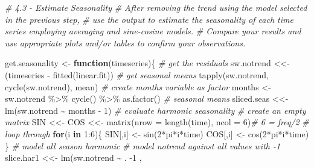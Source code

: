 \documentclass[
]{article}
\newenvironment{Shaded}{\begin{snugshade}}{\end{snugshade}}
\newcommand{\AttributeTok}[1]{\textcolor[rgb]{0.77,0.63,0.00}{#1}}
\newcommand{\CommentTok}[1]{\textcolor[rgb]{0.56,0.35,0.01}{\textit{#1}}}
\newcommand{\ControlFlowTok}[1]{\textcolor[rgb]{0.13,0.29,0.53}{\textbf{#1}}}
\newcommand{\DecValTok}[1]{\textcolor[rgb]{0.00,0.00,0.81}{#1}}
\newcommand{\FunctionTok}[1]{\textcolor[rgb]{0.00,0.00,0.00}{#1}}
\newcommand{\NormalTok}[1]{#1}
\newcommand{\OtherTok}[1]{\textcolor[rgb]{0.56,0.35,0.01}{#1}}
\newcommand{\SpecialCharTok}[1]{\textcolor[rgb]{0.00,0.00,0.00}{#1}}
\begin{document}
\begin{Shaded}
\begin{Highlighting}[]
\CommentTok{\# 4.3 {-} Estimate Seasonality}
\CommentTok{\# After removing the trend using the model selected in the previous step, }
\CommentTok{\# use the output to estimate the seasonality of each time series employing averaging and sine{-}cosine models. }
\CommentTok{\# Compare your results and use appropriate plots and/or tables to confirm your observations.}

\NormalTok{get.seasonality }\OtherTok{\textless{}{-}} \ControlFlowTok{function}\NormalTok{(timeseries)\{}
  \CommentTok{\# get the residuals}
\NormalTok{  sw.notrend }\OtherTok{\textless{}\textless{}{-}}\NormalTok{ (timeseries }\SpecialCharTok{{-}} \FunctionTok{fitted}\NormalTok{(linear.fit))}
  \CommentTok{\# get seasonal means}
  \FunctionTok{tapply}\NormalTok{(sw.notrend, }\FunctionTok{cycle}\NormalTok{(sw.notrend), mean)}
  \CommentTok{\# create months variable as factor}
\NormalTok{  months }\OtherTok{\textless{}{-}}\NormalTok{ sw.notrend }\SpecialCharTok{\%\textgreater{}\%} \FunctionTok{cycle}\NormalTok{() }\SpecialCharTok{\%\textgreater{}\%} \FunctionTok{as.factor}\NormalTok{()}
  \CommentTok{\# seasonal means}
\NormalTok{  sliced.seas }\OtherTok{\textless{}\textless{}{-}} \FunctionTok{lm}\NormalTok{(sw.notrend }\SpecialCharTok{\textasciitilde{}}\NormalTok{ months }\SpecialCharTok{{-}} \DecValTok{1}\NormalTok{)}
    \CommentTok{\# evaluate harmonic seasonality}
  \CommentTok{\# create an empty matrix}
\NormalTok{  SIN }\OtherTok{\textless{}\textless{}{-}}\NormalTok{ COS }\OtherTok{\textless{}\textless{}{-}}  \FunctionTok{matrix}\NormalTok{(}\AttributeTok{nrow =} \FunctionTok{length}\NormalTok{(time), }\AttributeTok{ncol =} \DecValTok{6}\NormalTok{)}\CommentTok{\# 6 = freq/2}
  \CommentTok{\# loop through}
  \ControlFlowTok{for}\NormalTok{(i }\ControlFlowTok{in} \DecValTok{1}\SpecialCharTok{:}\DecValTok{6}\NormalTok{)\{}
\NormalTok{    SIN[,i] }\OtherTok{\textless{}{-}} \FunctionTok{sin}\NormalTok{(}\DecValTok{2}\SpecialCharTok{*}\NormalTok{pi}\SpecialCharTok{*}\NormalTok{i}\SpecialCharTok{*}\NormalTok{time)}
\NormalTok{    COS[,i] }\OtherTok{\textless{}{-}} \FunctionTok{cos}\NormalTok{(}\DecValTok{2}\SpecialCharTok{*}\NormalTok{pi}\SpecialCharTok{*}\NormalTok{i}\SpecialCharTok{*}\NormalTok{time)}
\NormalTok{  \}}
  \CommentTok{\# model all season harmonic}
  \CommentTok{\# model notrend against all values with {-}1}
\NormalTok{  slice.har1 }\OtherTok{\textless{}\textless{}{-}} \FunctionTok{lm}\NormalTok{(sw.notrend }\SpecialCharTok{\textasciitilde{}}\NormalTok{ . }\SpecialCharTok{{-}}\DecValTok{1}\NormalTok{ ,}

\end{Highlighting}
\end{Shaded}
\end{document}
